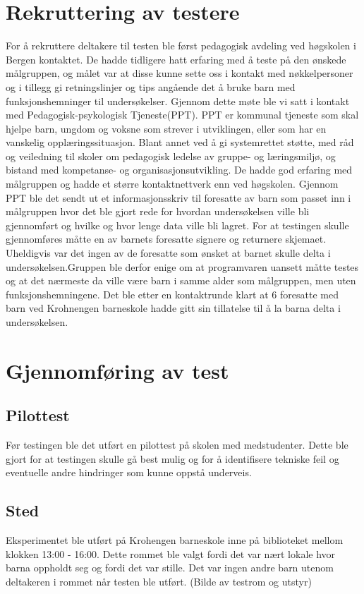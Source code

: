
\section{Rekruttering av testere}

For å rekruttere deltakere til testen ble først pedagogisk avdeling ved høgskolen i Bergen kontaktet. De hadde tidligere hatt erfaring med å teste på den ønskede målgruppen, og målet var at disse kunne sette oss i kontakt med nøkkelpersoner og i tillegg gi retningslinjer og tips angående det å bruke barn med funksjonshemninger til undersøkelser. Gjennom dette møte ble vi satt i kontakt med Pedagogisk-psykologisk Tjeneste(PPT). PPT er kommunal tjeneste som skal hjelpe barn, ungdom og voksne som strever i utviklingen, eller som har en vanskelig opplæringssituasjon. Blant annet ved å gi systemrettet støtte, med råd og veiledning til skoler om pedagogisk ledelse av gruppe- og læringsmiljø, og bistand med kompetanse- og organisasjonsutvikling. De hadde god erfaring med målgruppen og hadde et større kontaktnettverk
enn ved høgskolen. Gjennom PPT ble det sendt ut et informasjonsskriv til foresatte av barn som passet inn i målgruppen hvor det ble gjort rede for hvordan undersøkelsen ville bli gjennomført og hvilke og hvor lenge data ville bli lagret. For at testingen skulle gjennomføres måtte en av barnets foresatte signere og returnere skjemaet. Uheldigvis var det ingen av de foresatte som ønsket at barnet skulle delta i undersøkelsen.Gruppen ble derfor enige om at programvaren uansett måtte testes og at det nærmeste da ville være barn i samme alder som målgruppen, men uten funksjonshemningene. Det ble etter en kontaktrunde klart at 6 foresatte med barn ved Krohnengen barneskole hadde gitt sin tillatelse til å la barna delta i undersøkelsen.

\section{Gjennomføring av test}

\subsection{Pilottest}

Før testingen ble det utført en pilottest på skolen med medstudenter. Dette ble gjort for at testingen skulle gå best mulig og for å identifisere tekniske feil og eventuelle andre hindringer som kunne oppstå underveis.

\subsection{Sted}
Eksperimentet ble utført på Krohengen barneskole inne på biblioteket mellom klokken 13:00 -
16:00. Dette rommet ble valgt fordi det var nært lokale hvor barna oppholdt seg og fordi det var
stille. Det var ingen andre barn utenom deltakeren i rommet når testen ble utført.
(Bilde av testrom og utstyr) 

